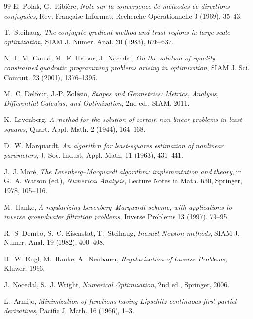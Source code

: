 \documentclass[11pt]{article}
\begin{document}
\begin{thebibliography}{99}
E.~Polak, G.~Ribi\`ere,
\emph{Note sur la convergence de m\'ethodes de directions conjugu\'ees},
Rev. Fran\c{c}aise Informat. Recherche Op\'erationnelle 3 (1969), 35--43.

T.~Steihaug,
\emph{The conjugate gradient method and trust regions in large scale
optimization},
SIAM J. Numer. Anal. 20 (1983), 626--637.

N.~I.~M. Gould, M.~E. Hribar, J.~Nocedal,
\emph{On the solution of equality constrained quadratic programming
problems arising in optimization},
SIAM J. Sci. Comput. 23 (2001), 1376--1395.

M.~C. Delfour, J.-P. Zol\'esio,
\emph{Shapes and Geometries: Metrics, Analysis, Differential Calculus,
and Optimization}, 2nd ed., SIAM, 2011.

K.~Levenberg,
\emph{A method for the solution of certain non-linear problems in least
squares},
Quart. Appl. Math. 2 (1944), 164--168.

D.~W. Marquardt,
\emph{An algorithm for least-squares estimation of nonlinear parameters},
J. Soc. Indust. Appl. Math. 11 (1963), 431--441.

J.~J. Mor\'e,
\emph{The Levenberg--Marquardt algorithm: implementation and theory},
in G.~A. Watson (ed.), \emph{Numerical Analysis}, Lecture Notes in
Math. 630, Springer, 1978, 105--116.

M.~Hanke,
\emph{A regularizing Levenberg--Marquardt scheme, with applications to
inverse groundwater filtration problems},
Inverse Problems 13 (1997), 79--95.

R.~S. Dembo, S.~C. Eisenstat, T.~Steihaug,
\emph{Inexact Newton methods},
SIAM J. Numer. Anal. 19 (1982), 400--408.

H.~W. Engl, M.~Hanke, A.~Neubauer,
\emph{Regularization of Inverse Problems},
Kluwer, 1996.

J.~Nocedal, S.~J. Wright,
\emph{Numerical Optimization}, 2nd ed., Springer, 2006.

L.~Armijo,
\emph{Minimization of functions having Lipschitz continuous first
partial derivatives},
Pacific J. Math. 16 (1966), 1--3.

\end{thebibliography}
\end{document}
